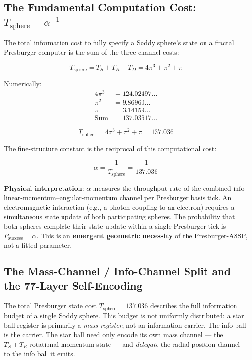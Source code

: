 \documentclass[11pt,a4paper]{article}
\begin{document}
\subsection{The Fundamental Computation Cost: $T_{\text{sphere}} = \alpha^{-1}$}

The total information cost to fully specify a Soddy sphere's state on a fractal Presburger computer is the sum of the three channel costs:

\[
  T_{\text{sphere}} = T_S + T_R + T_D = 4\pi^3 + \pi^2 + \pi
\]

Numerically:
\begin{align*}
  4\pi^3 &= 124.02497\ldots \\
  \pi^2  &= 9.86960\ldots \\
  \pi    &= 3.14159\ldots \\
  \text{Sum} &= 137.03617\ldots
\end{align*}

\[
  \boxed{T_{\text{sphere}} = 4\pi^3 + \pi^2 + \pi = 137.036}
\]

The fine-structure constant is the reciprocal of this computational cost:

\[
  \boxed{\alpha = \frac{1}{T_{\text{sphere}}} = \frac{1}{137.036}}
\]

\textbf{Physical interpretation}: $\alpha$ measures the throughput rate of the
combined info--linear-momentum--angular-momentum channel per Presburger basis tick.
An electromagnetic interaction (e.g., a photon coupling to an electron) requires a
simultaneous state update of both participating spheres. The probability that both
spheres complete their state update within a single Presburger tick is
$P_{\text{success}} = \alpha$. This is an \textbf{emergent geometric necessity} of
the Presburger-ASSP, not a fitted parameter.

\subsection{The Mass-Channel / Info-Channel Split and the 77-Layer Self-Encoding}

The total Presburger state cost $T_{\text{sphere}} = 137.036$ describes the full
information budget of a single Soddy sphere. This budget is not uniformly
distributed: a star ball register is primarily a \emph{mass register}, not an
information carrier. The info ball is the carrier. The star ball need only encode
its own mass channel --- the $T_S + T_R$ rotational-momentum state --- and
\emph{delegate} the radial-position channel to the info ball it emits.
\end{document}
